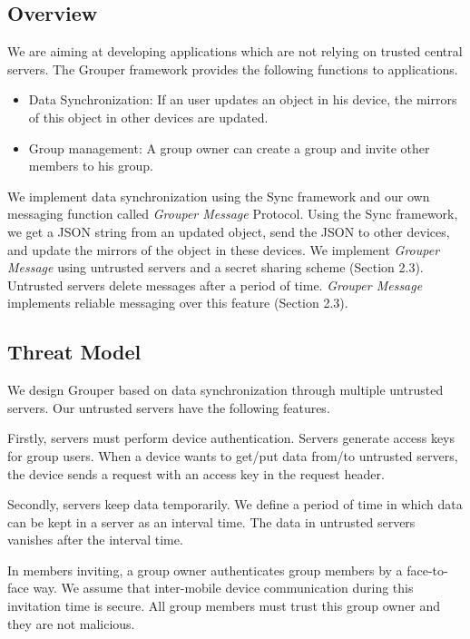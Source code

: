 \documentclass[twocolumn,10pt]{article}
\begin{document}
\subsection{Overview}

We are aiming at developing applications which are not relying on trusted central servers. 
The Grouper framework provides the following functions to applications.

\begin{itemize}
	\setlength{\itemsep}{1pt}
	\setlength{\parskip}{0pt}
	\setlength{\parsep}{0pt}
	\item Data Synchronization: If an user updates an object in his device, the mirrors of this object in other devices are updated.
	\item Group management: A group owner can create a group and invite other members to his group.
\end{itemize}

We implement data synchronization using the Sync framework\cite{sync} and our own messaging function called \emph{Grouper Message} Protocol.
Using the Sync framework, we get a JSON string from an updated object, send the JSON to other devices, and update the mirrors of the object in these devices. 
We implement \emph{Grouper Message} using untrusted servers and a secret sharing scheme  (Section 2.3). 
Untrusted servers delete messages after a period of time. 
\emph{Grouper Message} implements reliable messaging over this feature (Section 2.3).

\subsection{Threat Model}

We design Grouper based on data synchronization through multiple untrusted servers. Our untrusted servers have the following features.

Firstly, servers must perform device authentication. 
Servers generate access keys for group users. 
When a device wants to get/put data from/to untrusted servers, the device sends a request with an access key in the request header.

Secondly, servers keep data temporarily.
We define a period of time in which data can be kept in a server as an interval time. 
The data in untrusted servers vanishes after the interval time.

In members inviting, a group owner authenticates group members by a face-to-face way. We assume that inter-mobile device communication during this invitation time is secure. All group members must trust this group owner and they are not malicious.
\end{document}
